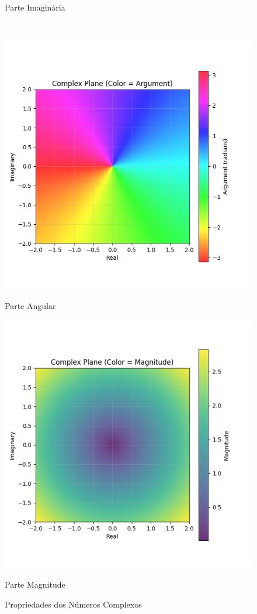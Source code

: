\begin{figure}[H]
\begin{minipage}{0.48\textwidth}
        \caption*{Parte Imaginária}
    \end{minipage}\\[1em]
    \begin{minipage}{0.48\textwidth}
        \centering
        \includegraphics[width=\textwidth]{Imagens//complexPlane/complex_plane_argument.png}
        \caption*{Parte Angular}
    \end{minipage}\hfill
    \begin{minipage}{0.48\textwidth}
        \centering
        \includegraphics[width=\textwidth]{Imagens//complexPlane/complex_plane_magnitude.png}
        \caption*{Parte Magnitude}
    \end{minipage}
    \caption{Propriedades dos Números Complexos}
    \label{fig:complexPlaneProps}
\end{figure}

